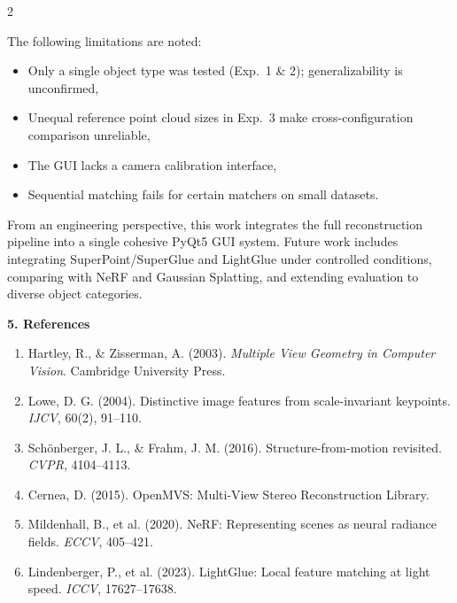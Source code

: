 \begin{multicols}{2}

The following limitations are noted:
\begin{itemize}
    \item Only a single object type was tested (Exp.\ 1 \& 2); generalizability is unconfirmed,
    \item Unequal reference point cloud sizes in Exp.\ 3 make cross-configuration comparison unreliable,
    \item The GUI lacks a camera calibration interface,
    \item Sequential matching fails for certain matchers on small datasets.
\end{itemize}

From an engineering perspective, this work integrates the full reconstruction pipeline into a single cohesive PyQt5 GUI system. Future work includes integrating SuperPoint/SuperGlue and LightGlue under controlled conditions, comparing with NeRF and Gaussian Splatting, and extending evaluation to diverse object categories.

\noindent\textbf{5. References}

\small
\begin{enumerate}
    \item Hartley, R., \& Zisserman, A. (2003). \textit{Multiple View Geometry in Computer Vision}. Cambridge University Press.
    \item Lowe, D. G. (2004). Distinctive image features from scale-invariant keypoints. \textit{IJCV}, 60(2), 91--110.
    \item Sch{\"o}nberger, J. L., \& Frahm, J. M. (2016). Structure-from-motion revisited. \textit{CVPR}, 4104--4113.
    \item Cernea, D. (2015). OpenMVS: Multi-View Stereo Reconstruction Library.
    \item Mildenhall, B., et al. (2020). NeRF: Representing scenes as neural radiance fields. \textit{ECCV}, 405--421.
    \item Lindenberger, P., et al. (2023). LightGlue: Local feature matching at light speed. \textit{ICCV}, 17627--17638.
\end{enumerate}
\normalsize

\end{multicols}